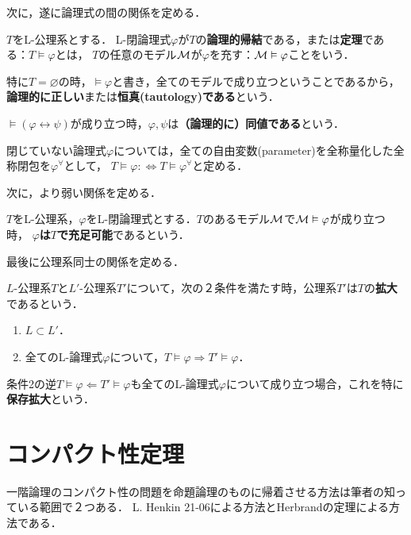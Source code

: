 \documentclass[uplatex, 12pt, dvipdfmx]{jsreport}
\begin{document}
次に，遂に論理式の間の関係を定める．

\begin{definition}
    $T$をL-公理系とする．
    L-閉論理式$\varphi$が$T$の\textbf{論理的帰結}である，または\textbf{定理}である：$T\vDash\varphi$とは，
    $T$の任意のモデル$\mathcal{M}$が$\varphi$を充す：$\mathcal{M}\vDash\varphi$ことをいう．

    特に$T=\varnothing$の時，$\vDash\varphi$と書き，全てのモデルで成り立つということであるから，
    \textbf{論理的に正しい}または\textbf{恒真(tautology)である}という．
    
    $\vDash(\varphi\leftrightarrow\psi)$が成り立つ時，$\varphi,\psi$は\textbf{（論理的に）同値である}という．
\end{definition}
\begin{remark}
    閉じていない論理式$\varphi$については，全ての自由変数(parameter)を全称量化した全称閉包を$\varphi^\forall$として，
    $T\vDash\varphi:\Leftrightarrow T\vDash\varphi^\forall$と定める．
\end{remark}

次に，より弱い関係を定める．

\begin{definition}[satisfiability]
    $T$をL-公理系，$\varphi$をL-閉論理式とする．$T$のあるモデル$\mathcal{M}$で$\mathcal{M}\vDash\varphi$が成り立つ時，
    \textbf{$\varphi$は$T$で充足可能}であるという．
\end{definition}

最後に公理系同士の関係を定める．

\begin{definition}[extension]
    $L$-公理系$T$と$L'$-公理系$T'$について，次の２条件を満たす時，公理系$T'$は$T$の\textbf{拡大}であるという．
    \begin{enumerate}
        \item $L\subset L'$．
        \item 全てのL-論理式$\varphi$について，$T\vDash\varphi\Rightarrow T'\vDash\varphi$．
    \end{enumerate}
    条件2の逆$T\vDash\varphi\Leftarrow T'\vDash\varphi$も全てのL-論理式$\varphi$について成り立つ場合，これを特に\textbf{保存拡大}という．
\end{definition}

\section{コンパクト性定理}

一階論理のコンパクト性の問題を命題論理のものに帰着させる方法は筆者の知っている範囲で２つある．
L. Henkin 21-06による方法とHerbrandの定理による方法である．
\end{document}
